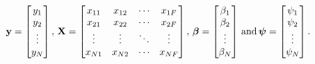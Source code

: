 \begin{equation}
 \mat{y} =
  \begin{bmatrix} 
 	y_{1} \\
 	y_{2} \\
 	\vdots \\
 	y_{N} 
 \end{bmatrix}, \,
%
 \mat{X} =
  \begin{bmatrix}
   x_{11} & x_{12} & \cdots & x_{1F} \\
   x_{21} & x_{22} & \cdots & x_{2F} \\
   \vdots & \vdots & \ddots & \vdots \\
   x_{N1} & x_{N2} & \cdots & x_{NF} 
   \end{bmatrix}, \,
%
 \mat{\beta} =
  \begin{bmatrix} 
 	\beta_{1} \\
 	\beta_{2} \\
 	\vdots \\
 	\beta_{N} 
 \end{bmatrix}\,\text{and} \, 
%
\mat{\psi} =
  \begin{bmatrix} 
 	\psi_{1} \\
 	\psi_{2} \\
 	\vdots \\
 	\psi_{N} 
 \end{bmatrix}.
\end{equation}



